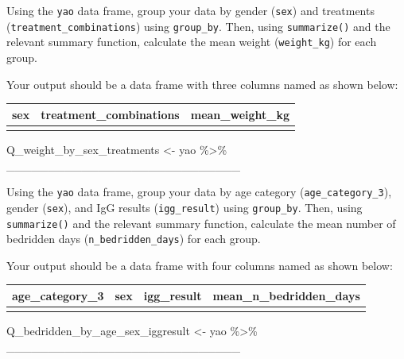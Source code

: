 \documentclass[
  letterpaper,
  DIV=11,
  numbers=noendperiod]{scrreprt}
\newenvironment{Shaded}{\begin{snugshade}}{\end{snugshade}}
\newcommand{\NormalTok}[1]{\textcolor[rgb]{0.00,0.23,0.31}{#1}}
\newcommand{\OtherTok}[1]{\textcolor[rgb]{0.00,0.23,0.31}{#1}}
\newcommand{\SpecialCharTok}[1]{\textcolor[rgb]{0.37,0.37,0.37}{#1}}
\begin{document}
\begin{tcolorbox}[enhanced jigsaw, titlerule=0mm, colback=white, left=2mm, breakable, opacitybacktitle=0.6, colbacktitle=quarto-callout-tip-color!10!white, colframe=quarto-callout-tip-color-frame, bottomtitle=1mm, opacityback=0, coltitle=black, arc=.35mm, toptitle=1mm, title=\textcolor{quarto-callout-tip-color}{\faLightbulb}\hspace{0.5em}{Practice}, leftrule=.75mm, toprule=.15mm, bottomrule=.15mm, rightrule=.15mm]

Using the \texttt{yao} data frame, group your data by gender
(\texttt{sex}) and treatments (\texttt{treatment\_combinations}) using
\texttt{group\_by}. Then, using \texttt{summarize()} and the relevant
summary function, calculate the mean weight (\texttt{weight\_kg}) for
each group.

Your output should be a data frame with three columns named as shown
below:

\begin{longtable}[]{@{}lll@{}}
\toprule\noalign{}
sex & treatment\_combinations & mean\_weight\_kg \\
\midrule\noalign{}
\endhead
\bottomrule\noalign{}
\endlastfoot
& & \\
\end{longtable}

\begin{Shaded}
\begin{Highlighting}[]
\NormalTok{Q\_weight\_by\_sex\_treatments }\OtherTok{\textless{}{-}} 
\NormalTok{  yao }\SpecialCharTok{\%\textgreater{}\%}
\NormalTok{  \_\_\_\_\_\_\_\_\_\_\_\_\_\_\_\_\_\_\_\_\_\_\_\_\_\_\_\_}
\end{Highlighting}
\end{Shaded}

Using the \texttt{yao} data frame, group your data by age category
(\texttt{age\_category\_3}), gender (\texttt{sex}), and IgG results
(\texttt{igg\_result}) using \texttt{group\_by}. Then, using
\texttt{summarize()} and the relevant summary function, calculate the
mean number of bedridden days (\texttt{n\_bedridden\_days}) for each
group.

Your output should be a data frame with four columns named as shown
below:

\begin{longtable}[]{@{}llll@{}}
\toprule\noalign{}
age\_category\_3 & sex & igg\_result & mean\_n\_bedridden\_days \\
\midrule\noalign{}
\endhead
\bottomrule\noalign{}
\endlastfoot
& & & \\
\end{longtable}

\begin{Shaded}
\begin{Highlighting}[]
\NormalTok{Q\_bedridden\_by\_age\_sex\_iggresult }\OtherTok{\textless{}{-}} 
\NormalTok{  yao }\SpecialCharTok{\%\textgreater{}\%}
\NormalTok{  \_\_\_\_\_\_\_\_\_\_\_\_\_\_\_\_\_\_\_\_\_\_\_\_\_\_\_\_}
\end{Highlighting}
\end{Shaded}

\end{tcolorbox}
\end{document}
